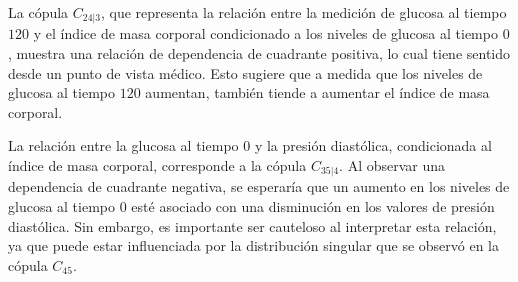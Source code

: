 La cópula $C_{24|3}$, que representa la relación entre la medición de glucosa al tiempo $120$ y el índice de masa corporal condicionado a los niveles de glucosa al tiempo $0$, muestra una relación de dependencia de cuadrante positiva, lo cual tiene sentido desde un punto de vista médico. Esto sugiere que a medida que los niveles de glucosa al tiempo $120$ aumentan, también tiende a aumentar el índice de masa corporal.

La relación entre la glucosa al tiempo $0$ y la presión diastólica, condicionada al índice de masa corporal, corresponde a la cópula $C_{35|4}$. Al observar una dependencia de cuadrante negativa, se esperaría que un aumento en los niveles de glucosa al tiempo $0$ esté asociado con una disminución en los valores de presión diastólica. Sin embargo, es importante ser cauteloso al interpretar esta relación, ya que puede estar influenciada por la distribución singular que se observó en la cópula $C_{45}$.


\begin{figure}[H]
 \centering
\end{figure}

